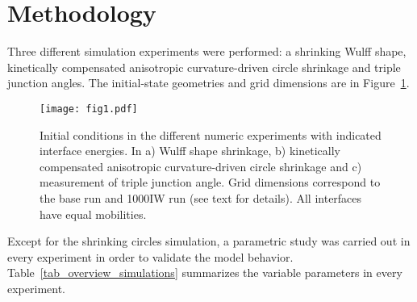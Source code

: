 \section{Methodology}
Three different simulation experiments were performed: a shrinking Wulff shape, kinetically compensated anisotropic curvature-driven circle shrinkage and triple junction angles. The initial-state geometries and grid dimensions are in Figure~\ref{fig_IC_sketch}. 
\label{sec_Numeric}
\begin{figure}[]
	\centering
	\texttt{[image: fig1.pdf]}
	\caption{Initial conditions in the different numeric experiments with indicated interface energies. In a) Wulff shape shrinkage, b) kinetically compensated anisotropic curvature-driven circle shrinkage and c)  measurement of triple junction angle.  Grid dimensions correspond to the base run and 1000IW run (see text for details). All interfaces have equal mobilities.}
	\label{fig_IC_sketch}
\end{figure} 
Except for the shrinking circles simulation, a parametric study was carried out in every experiment in order to validate the model behavior. Table~\ref{tab_overview_simulations} summarizes the variable parameters in every experiment.
{}

